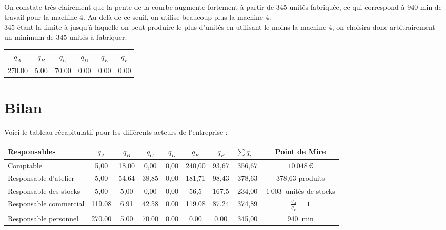 \documentclass[paper=a4, fontsize=11pt]{report}
\numberwithin{equation}{section}		%
\numberwithin{figure}{section}			%
\numberwithin{table}{section}				%
\begin{document}
On constate très clairement que la pente de la courbe augmente fortement à partir de 345 unités fabriquée, ce qui correspond à 940 min de travail pour la machine 4. Au delà de ce seuil, on utilise beaucoup plus la machine 4.\\

345 étant la limite à jusqu'à laquelle on peut produire le plus d’unités en utilisant le moins la machine 4, on choisira donc arbitrairement un minimum de 345 unités à fabriquer.

\begin{center}
\begin{tabular}{cccccc}
\hline
$q_A$ & $q_B$ & $q_C$ & $q_D$ & $q_E$ & $q_F$ \\
\hline
270.00 & 5.00 & 70.00 & 0.00 & 0.00 & 0.00 \\
\hline
\end{tabular}
\end{center}


\section{Bilan}

Voici le tableau récapitulatif pour les différents acteurs de l'entreprise :

\begin{center}
\begin{tabular}{l|cccccc|cc}
\hline
Responsables & $q_A$ & $q_B$ & $q_C$ & $q_D$ & $q_E$ & $q_F$ & $\sum q_i \quad$ & Point de Mire \\
\hline
Comptable & 5,00 & 18,00 & 0,00 & 0,00 & 240,00 & 93,67 & 356,67 & $10 \:048\,$€\\
Responsable d'atelier & 5,00 & 54.64 & 38,85 & 0,00 & 181,71 & 98,43 & 378,63 & 378,63 produits\\
Responsable des stocks & 5,00 & 5,00 & 0,00 & 0,00 & 56,5 & 167,5 & 234,00 & $1\:003\,$ unités de stocks\\
Responsable commercial & 119.08 & 6.91 & 42.58 & 0.00 & 119.08 & 87.24 & 374,89 & $\frac{q_A}{q_E}=1$\\
Responsable personnel & 270.00 & 5.00 & 70.00 & 0.00 & 0.00 & 0.00 & 345,00 & $940\,$ min \\

\hline
\end{tabular}
\end{center}
\end{document}
